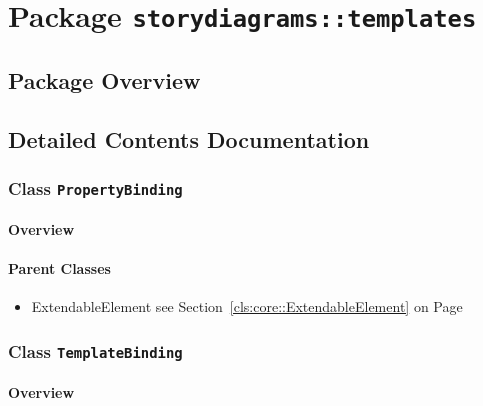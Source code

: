 \section{Package \bfseries \texttt{storydiagrams::templates}\normalfont}
\subsection{Package Overview}

		



\subsection{Detailed Contents Documentation}
\subsubsection{\Large{Class \bfseries \texttt{PropertyBinding}\normalfont}}
\label{cls:storydiagrams::templates::PropertyBinding} 
\paragraph{Overview}

	



\paragraph{Parent Classes}
\begin{itemize}
\item ExtendableElement see Section~\ref{cls:core::ExtendableElement} on Page~\pageref{cls:core::ExtendableElement}\end{itemize}
\subsubsection{\Large{Class \bfseries \texttt{TemplateBinding}\normalfont}}
\label{cls:storydiagrams::templates::TemplateBinding} 
\paragraph{Overview}

	



